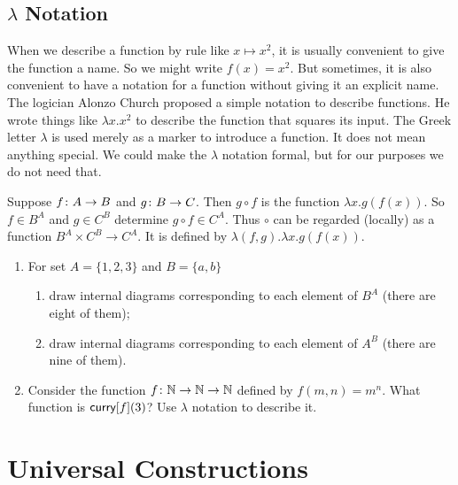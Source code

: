 \subsection*{$\lambda$ Notation}

When we describe a function by  rule like $x\mapsto x^2$, it is usually convenient to give the function a name.
So we might write $f(x) = x^2$.
But sometimes, it is also convenient to have a notation for a function without giving it an explicit name. 
The logician Alonzo Church \cite{church} proposed a simple notation to describe functions. 
He wrote things like $\lambda x.x^2$ to describe the function that squares its input. 
The Greek letter $\lambda$ is used merely as a marker to introduce a function. 
It does not mean anything special. 
We could make the $\lambda$ notation formal, but for our purposes we do not need that.

\begin{example}
	Suppose ${f}\colon{A}\to{B}$ and ${g}\colon{B}\to{C}$. Then $g\circ f$ is the function
	$\lambda x.g(f(x))$.  So $f\in B^A$ and $g\in C^B$ determine $g\circ f\in C^A$.
	Thus $\circ$ can be regarded (locally) as a function $B^A\times C^B\to C^A$.
	It is defined by $\lambda(f,g).\lambda x.g(f(x))$.
\end{example}
 

\begin{exercises}
	\begin{enumerate}
		\item  For set $A= \{1,2,3\}$ and $B = \{a,b\}$ 
			\begin{enumerate}
				\item draw internal diagrams corresponding to each element of $B^A$ (there are eight of them);
				\item draw internal diagrams corresponding to each element of $A^B$ (there are nine of them).
			\end{enumerate}
		\item Consider the function ${f}\colon{\mathbb N\to\mathbb N}\to{\mathbb N}$ defined by
		      $f(m,n) = m^n$. What function is $\mathord{\textsf{curry}}[f](3)$? Use $\lambda$ notation to describe it.
	\end{enumerate}	
\end{exercises}

\section{Universal Constructions}

